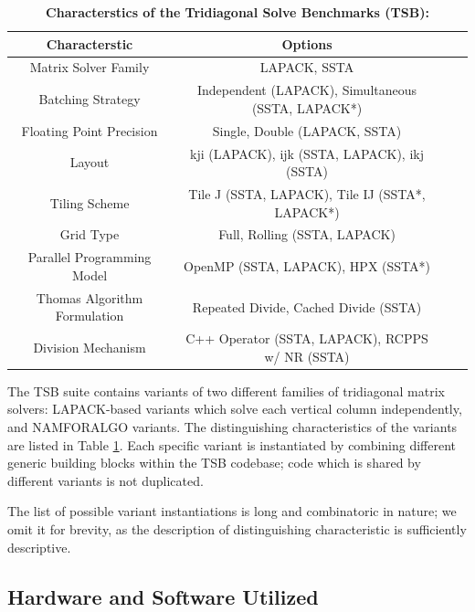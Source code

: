 \documentclass{sig-alternate-05-2015}
\begin{document}
\begin{table}%
\centering
\caption{\textbf{Characterstics of the Tridiagonal Solve Benchmarks (TSB):}}
\begin{tabular}{|c|c|c|c|} \hline
\textbf{Characterstic}       & \textbf{Options}                                     \\ \hline
Matrix Solver Family         & LAPACK, SSTA                                         \\ \hline
Batching Strategy            & Independent (LAPACK), Simultaneous (SSTA, LAPACK*)   \\ \hline
Floating Point Precision     & Single, Double (LAPACK, SSTA)                        \\ \hline 
Layout                       & kji (LAPACK), ijk (SSTA, LAPACK), ikj (SSTA)         \\ \hline
Tiling Scheme                & Tile J (SSTA, LAPACK), Tile IJ (SSTA*, LAPACK*)      \\ \hline
Grid Type                    & Full, Rolling (SSTA, LAPACK)                         \\ \hline
Parallel Programming Model   & OpenMP (SSTA, LAPACK), HPX (SSTA*)                   \\ \hline
Thomas Algorithm Formulation & Repeated Divide, Cached Divide (SSTA)                \\ \hline
Division Mechanism           & C++ Operator (SSTA, LAPACK), RCPPS w/ NR (SSTA)      \\ \hline
\end{tabular}
\label{tab:tsb_variant_characterstics}
\end{table}

The TSB suite contains variants of two different families of tridiagonal matrix
solvers: LAPACK-based variants which solve each vertical column independently, and
NAMFORALGO variants. The distinguishing characteristics of the variants are
listed in Table \ref{tab:tsb_variant_characterstics}. Each specific variant is
instantiated by combining different generic building blocks within the TSB
codebase; code which is shared by different variants is not duplicated.

The list of possible variant instantiations is long and combinatoric in nature;
we omit it for brevity, as the description of distinguishing characteristic is
sufficiently descriptive.

\subsection{Hardware and Software Utilized}
\label{sec:experimental_setup:hardware_and_software_utilized}
\end{document}
